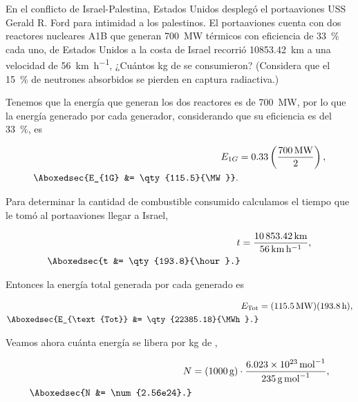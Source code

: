 \documentclass[./../main.tex]{subfiles}
\begin{document}
    \begin{exercise}
        En el conflicto de Israel-Palestina, Estados Unidos desplegó el portaaviones USS Gerald R. Ford para intimidad a los palestinos. El portaaviones cuenta con dos reactores nucleares A1B que generan \qty{700}{\MW} térmicos con eficiencia de \qty{33}{\percent} cada uno, de Estados Unidos a la costa de Israel recorrió \qty{10853.42}{\km} a una velocidad de \qty{56}{\km\per\hour}, ¿Cuántos \unit{\kg} de  se consumieron? (Considera que el \qty{15}{\percent} de neutrones absorbidos se pierden en captura radiactiva.)

        \begin{solution}
            Tenemos que la energía que generan los dos reactores es de \qty{700}{\MW}, por lo que la energía generado por cada generador, considerando que su eficiencia es del \qty{33}{\percent}, es 

            \begin{align*}
                E_{1G} &= 0.33\left(\dfrac{\qty{700}{\MW}}{2}\right),\\
                \Aboxedsec{E_{1G} &= \qty{115.5}{\MW}}.
            \end{align*}

            Para determinar la cantidad de combustible consumido calculamos el tiempo que le tomó al portaaviones llegar a Israel,

            \begin{align*}
                t &= \dfrac{\qty{10853.42}{\km}}{\qty{56}{\km\per\hour}},\\
                \Aboxedsec{t &= \qty{193.8}{\hour}.}
            \end{align*}

            Entonces la energía total generada por cada generado es

            \begin{align*}
                E_{\text{Tot}} &= (\qty{115.5}{\MW})(\qty{193.8}{\hour}),\\
                \Aboxedsec{E_{\text{Tot}} &= \qty{22385.18}{\MWh}.}
            \end{align*}

            Veamos ahora cuánta energía se libera por \unit{\kg} de ,

            \begin{align*}
                N &= (\qty{1000}{\g})\cdot\dfrac{\qty[per-mode=power]{6.023e23}{\per\mol}}{\qty{235}{\g\per\mol}},\\
                \Aboxedsec{N &= \num{2.56e24}.}
            \end{align*}


\end{solution}
\end{exercise}
\end{document}
